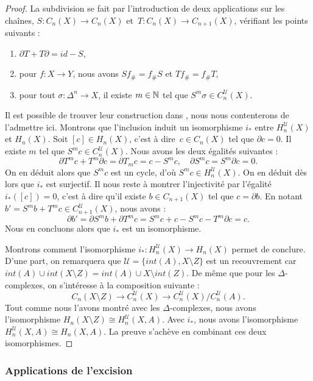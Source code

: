 \begin{proof}
La subdivision se fait par l'introduction de deux applications sur les chaînes, $S:C_n(X)\to C_n(X)$ et~$T:C_n(X)\to C_{n+1}(X)$, vérifiant les points suivants :\begin{enumerate}
\item $\partial T+T\partial=id-S$,
\item pour $f:X\to Y$, nous avons $Sf_\#=f_\#S$ et $Tf_\#=f_\#T$,
\item pour tout $\sigma:\Delta^n\to X$, il existe $m\in\mathbb{N}$ tel que $S^m\sigma\in C_n^\mathcal{U}(X)$.
\end{enumerate} 
Il est possible de trouver leur construction dans \cite[][Proposition~2.21]{Hatcher}, nous nous contenterons de l'admettre ici. Montrons que l'inclusion induit un isomorphisme $i_\ast$ entre $H_n^\mathcal{U}(X)$ et $H_n(X)$. Soit $[c]\in H_n(X)$, c'est à dire~$c\in C_n(X)$ tel que $\partial c=0$. Il existe $m$ tel que $S^mc\in C_n^\mathcal{U}(X)$. Nous avons les deux égalités suivantes : \[\partial T^mc+T^m\partial c=\partial T_mc=c-S^mc,\quad \partial S^mc=S^m\partial c=0.\]On en déduit alors que $S^mc$ est un cycle, d'où $S^mc\in H_n^\mathcal{U}(X)$. On en déduit dès lors que $i_\ast$ est surjectif. Il nous reste à montrer l'injectivité par l'égalité $i_\ast([c])=0$, c'est à dire qu'il existe $b\in C_{n+1}(X)$ tel que $c=\partial b$. En notant $b'=S^mb+T^mc\in C_{n+1}^\mathcal{U}(X)$, nous avons : \[\partial b'=\partial S^mb+\partial T^mc=S^mc+c-S^mc-T^m\partial c=c.\]Nous en concluons alors que $i_\ast$ est un isomorphisme.

\bigskip Montrons comment l'isomorphisme $i_\ast:H_n^\mathcal{U}(X)\to H_n(X)$ permet de conclure. D'une part, on remarquera que $\mathcal{U}=\{int(A),X\setminus Z\}$ est un recouvrement car $int(A)\cup int(X\setminus Z)=int(A)\cup X\setminus int(Z)$. De même que pour les $\Delta$-complexes, on s'intéresse à la composition suivante :\[C_n(X\setminus Z)\to C_n^\mathcal{U}(X)\to C_n^\mathcal{U}(X)/C_n^\mathcal{U}(A).\]Tout comme nous l'avons montré avec les $\Delta$-complexes, nous avons l'isomorphisme $H_n(X\setminus Z)\cong H_n^\mathcal{U}(X, A)$. Avec $i_\ast$, nous avons l'isomorphisme $H_n^\mathcal{U}(X, A)\cong H_n(X,A)$. La preuve s'achève en combinant ces deux isomorphismes.
\end{proof}

\subsubsection{Applications de l'excision}

